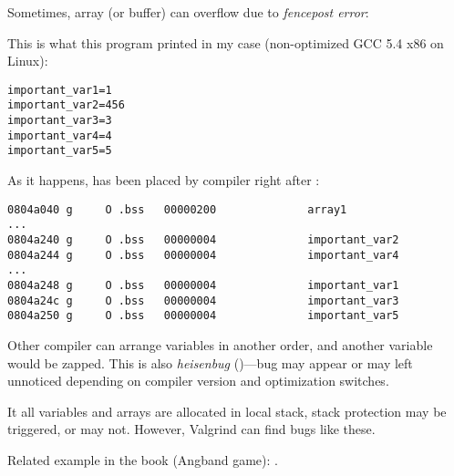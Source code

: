 \label{GlobalArraysOverflowHeisenbug}

Sometimes, array (or buffer) can overflow due to \emph{fencepost error}:



This is what this program printed in my case (non-optimized GCC 5.4 x86 on Linux):

\begin{lstlisting}
important_var1=1
important_var2=456
important_var3=3
important_var4=4
important_var5=5
\end{lstlisting}

As it happens,  has been placed by compiler right after :

\begin{lstlisting}[caption=objdump -x]
0804a040 g     O .bss   00000200              array1
...
0804a240 g     O .bss   00000004              important_var2
0804a244 g     O .bss   00000004              important_var4
...
0804a248 g     O .bss   00000004              important_var1
0804a24c g     O .bss   00000004              important_var3
0804a250 g     O .bss   00000004              important_var5
\end{lstlisting}

Other compiler can arrange variables in another order, and another variable would be zapped.
This is also \textit{heisenbug} ()---bug may appear or may left unnoticed
depending on compiler version and optimization switches.

It all variables and arrays are allocated in local stack, stack protection may be triggered, or may not.
However, Valgrind can find bugs like these.

Related example in the book (Angband game): .


